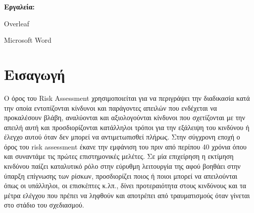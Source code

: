 \documentclass[12pt,a4paper,oneside]{article}
\begin{document}
\vspace{8cm}

\raggedright
\textbf{Εργαλεία:}

    Overleaf
    
    Microsoft Word
    
    

\newpage


\tableofcontents
{}

\newpage
\setcounter{page}{1}


\section{Εισαγωγή}\label{sec:intro}
\pagestyle{fancy}
\justifying
\noindent
\hspace{1cm}Ο όρος του Risk Assessment χρησιμοποιείται για να περιγράψει την διαδικασία κατά την οποία εντοπίζονται κίνδυνοι και παράγοντες απειλών που ενδέχεται να προκαλέσουν βλάβη, αναλύονται και αξιολογούνται κίνδυνοι που σχετίζονται με την απειλή αυτή και προσδιορίζονται κατάλληλοι τρόποι για την εξάλειψη του κινδύνου ή έλεγχο αυτού όταν δεν μπορεί να αντιμετωπισθεί πλήρως. Στην σύγχρονη εποχή ο όρος του risk assessment έκανε την εμφάνιση του πριν από περίπου 40 χρόνια όπου και συναντάμε τις πρώτες επιστημονικές μελέτες. Σε μία επιχείρηση η εκτίμηση κινδύνου παίζει καταλυτικό ρόλο στην εύρυθμη λειτουργία της αφού βοηθάει στην ύπαρξη επίγνωσης των ρίσκων, προσδιορίζει ποιος ή ποιοι μπορεί να απειλούνται όπως οι υπάλληλοι, οι επισκέπτες κ.λπ., δίνει προτεραιότητα στους κινδύνους και τα μέτρα ελέγχου που πρέπει να ληφθούν και αποτρέπει από τραυματισμούς όταν γίνεται στο στάδιο του σχεδιασμού.\par
\end{document}
